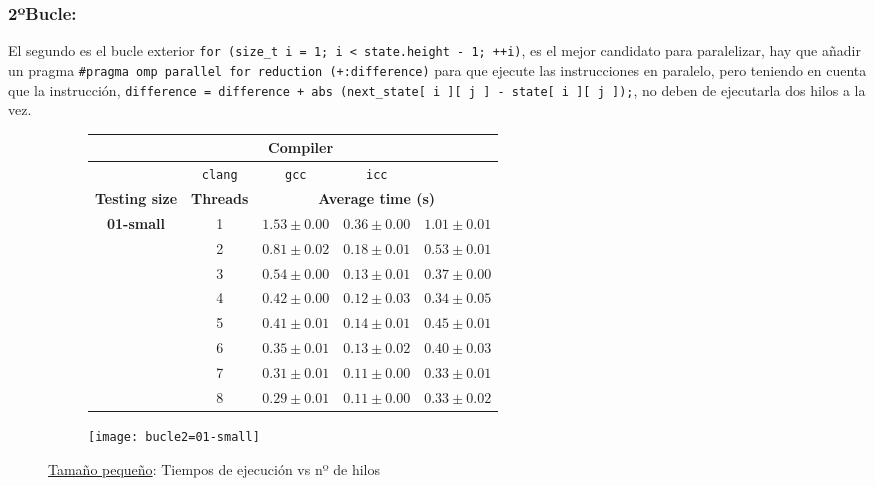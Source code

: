 
\subsubsection{\textbf{2ºBucle:} }

\par El segundo es el bucle exterior \texttt{for (size\_t i = 1; i < state.height - 1; ++i)}, es el mejor candidato para paralelizar, hay que añadir un
pragma \texttt{\#pragma omp parallel for reduction (+:difference)} para que ejecute las instrucciones en paralelo, pero teniendo en cuenta que la
instrucción, \texttt{difference = difference + abs (next\_state[ i ][ j ] - state[ i ][ j ]);}, no deben de ejecutarla dos hilos a la vez.

\begin{figure}[H]
    \centering
    \begin{subfigure}{0.4\textwidth}
        \begin{adjustbox}{width=\textwidth} 
        \begin{tabular}{|c|c|c|c|c|}
            \hline
            \rowcolor{azul} \multicolumn{2}{|c|}{}&\multicolumn{3}{c|}{\textbf{Compiler}} \\ \hline
            \rowcolor{azul} \multicolumn{2}{|c|}{}&\texttt{clang}&\texttt{gcc}&\texttt{icc}\\ \hline
            \rowcolor{azul} \textbf{Testing size} & \textbf{Threads}&\multicolumn{3}{c|}{\textbf{Average time (s)}} \\ \hline
            \multirow{8}{1cm}{\textbf{01-small}} & 1 & \(1.53\pm{0.00}\) & \(0.36\pm{0.00}\) & \(1.01\pm{0.01}\) \\ \cline{2-5}
            & 2 & \(0.81\pm{0.02}\) & \(0.18\pm{0.01}\) & \(0.53\pm{0.01}\) \\ \cline{2-5}
            & 3 & \(0.54\pm{0.00}\) & \(0.13\pm{0.01}\) & \(0.37\pm{0.00}\) \\ \cline{2-5}
            & 4 & \(0.42\pm{0.00}\) & \(0.12\pm{0.03}\) & \(0.34\pm{0.05}\) \\ \cline{2-5}
            & 5 & \(0.41\pm{0.01}\) & \(0.14\pm{0.01}\) & \(0.45\pm{0.01}\) \\ \cline{2-5}
            & 6 & \(0.35\pm{0.01}\) & \(0.13\pm{0.02}\) & \(0.40\pm{0.03}\) \\ \cline{2-5}
            & 7 & \(0.31\pm{0.01}\) & \(0.11\pm{0.00}\) & \(0.33\pm{0.01}\) \\ \cline{2-5}
            & 8 & \(0.29\pm{0.01}\) & \(0.11\pm{0.00}\) & \(0.33\pm{0.02}\) \\ \hline
        \end{tabular}
        \end{adjustbox}
    \end{subfigure}
    \hfill
    \begin{subfigure}{0.5\textwidth}
        \texttt{[image: bucle2=01-small]}
    \end{subfigure}
    \caption{\underline{Tamaño pequeño}: Tiempos de ejecución vs nº de hilos}
    \label{fig:bucle2=01-small}
\end{figure}

